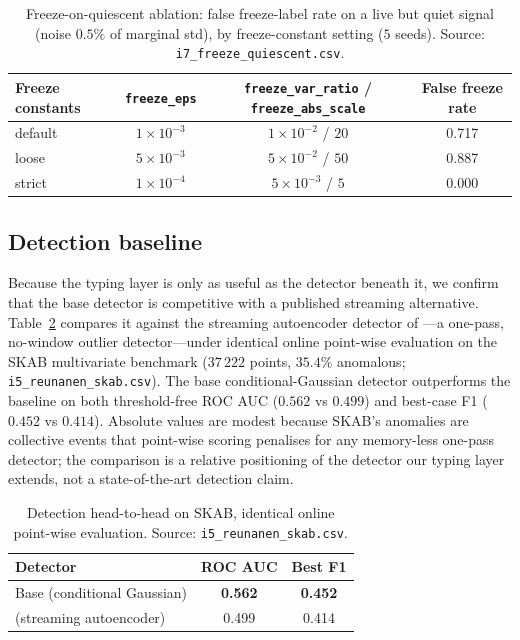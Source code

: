 \begin{table}[t]
    \centering
    \caption{Freeze-on-quiescent ablation: false freeze-label rate on a live but quiet signal (noise $0.5\%$ of marginal std), by freeze-constant setting ($5$ seeds). Source: \texttt{i7\_freeze\_quiescent.csv}.}
    \label{tab:quiescent}
    \begin{tabular}{lccc}
        \toprule
        Freeze constants & \texttt{freeze\_eps} & \texttt{freeze\_var\_ratio} / \texttt{freeze\_abs\_scale} & False freeze rate \\
        \midrule
        default & $1\times10^{-3}$ & $1\times10^{-2}$ / $20$ & 0.717 \\
        loose   & $5\times10^{-3}$ & $5\times10^{-2}$ / $50$ & 0.887 \\
        strict  & $1\times10^{-4}$ & $5\times10^{-3}$ / $5$  & 0.000 \\
        \bottomrule
    \end{tabular}
\end{table}

\subsection{Detection baseline}
\label{sec:baseline}
Because the typing layer is only as useful as the detector beneath it, we confirm that the base detector is competitive with a published streaming alternative. Table~\ref{tab:baseline} compares it against the streaming autoencoder detector of \citet{Reunanen2020}---a one-pass, no-window outlier detector---under identical online point-wise evaluation on the SKAB multivariate benchmark ($37\,222$ points, $35.4\%$ anomalous; \texttt{i5\_reunanen\_skab.csv}). The base conditional-Gaussian detector outperforms the baseline on both threshold-free ROC AUC ($0.562$ vs $0.499$) and best-case F1 ($0.452$ vs $0.414$). Absolute values are modest because SKAB's anomalies are collective events that point-wise scoring penalises for any memory-less one-pass detector; the comparison is a relative positioning of the detector our typing layer extends, not a state-of-the-art detection claim.

\begin{table}[t]
    \centering
    \caption{Detection head-to-head on SKAB, identical online point-wise evaluation. Source: \texttt{i5\_reunanen\_skab.csv}.}
    \label{tab:baseline}
    \begin{tabular}{lcc}
        \toprule
        Detector & ROC AUC & Best F1 \\
        \midrule
        Base (conditional Gaussian) & \textbf{0.562} & \textbf{0.452} \\
        \citet{Reunanen2020} (streaming autoencoder) & 0.499 & 0.414 \\
        \bottomrule
    \end{tabular}
\end{table}

